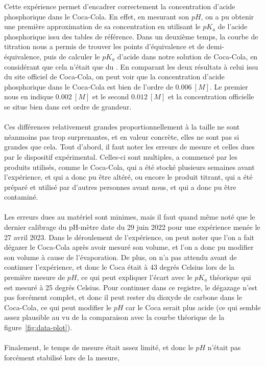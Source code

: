 \documentclass[11pt]{article}
\begin{document}
Cette expérience permet d'encadrer correctement la concentration d'acide phosphorique dans le Coca-Cola.
En effet, en mesurant son $pH$, on a pu obtenir une première approximation de sa concentration en utilisant le $pK_a$
de l'acide phosphorique issu des tables de référence.
Dans un deuxième temps, la courbe de titration nous a permis de trouver les points d'équivalence et de demi-équivalence,
puis de calculer le $pK_a$ d'acide dans notre solution de Coca-Cola, en considérant que cela n'était que du .
En comparant les deux résultats à celui issu du site officiel de Coca-Cola, on peut voir que la concentration
d'acide phosphorique dans le Coca-Cola est bien de l'ordre de $0.006 \ [M]$.
Le premier nous en indique $0.002 \ [M]$ et le second $0.012 \ [M]$ et la concentration officielle se situe bien
dans cet ordre de grandeur.\\ \\
Ces différences relativement grandes proportionnellement à la taille ne sont néanmoins pas trop surprenantes, et en
valeur concrète, elles ne sont pas si grandes que cela.
Tout d'abord, il faut noter les erreurs de mesure et celles dues par le dispositif expérimental.
Celles-ci sont multiples, a commencé par les produits utilisés, comme le Coca-Cola, qui a été stocké plusieurs semaines
avant l'expérience, et qui a donc pu être altéré, ou encore le produit titrant, qui a été préparé et utilisé
par d'autres personnes avant nous, et qui a donc pu être contaminé.\\ \\
Les erreurs dues au matériel sont minimes, mais il faut quand même noté que le dernier calibrage du pH-mètre date du
29 juin 2022 pour une expérience menée le 27 avril 2023.
Dans le déroulement de l'expérience, on peut noter que l'on a fait dégazer le Coca-Cola après avoir mesuré son volume,
et l'on a donc pu modifier son volume à cause de l'évaporation.
De plus, on n'a pas attendu avant de continuer l'expérience, et donc le Coca était à 43 degrés Celsius lors de la
première mesure de $pH$, ce qui peut expliquer l'écart avec le $pK_a$ théorique qui est mesuré à 25 degrés Celsius.
Pour continuer dans ce registre, le dégazage n'est pas forcément complet, et donc il peut rester du dioxyde de carbone
dans le Coca-Cola, ce qui peut modifier le $pH$ car le Coca serait plus acide (ce qui semble assez plausible au vu
de la comparaison avec la courbe théorique de la figure~\ref{fig:data-plot}).\\ \\
Finalement, le temps de mesure était assez limité, et donc le $pH$ n'était pas forcément stabilisé lors de la mesure,
\end{document}
